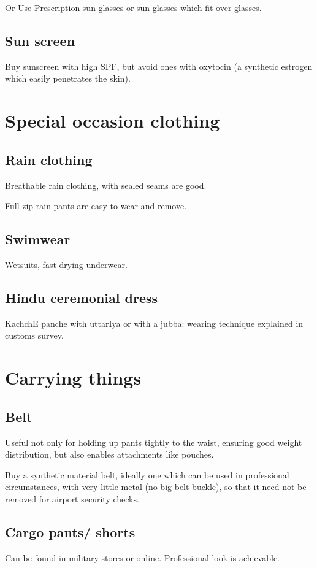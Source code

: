 \documentclass[oneside, article]{memoir}
\begin{document}
Or Use Prescription sun glasses or sun glasses which fit over glasses. 

\section{Sun screen}
Buy sunscreen with high SPF, but avoid ones with oxytocin (a synthetic estrogen which easily penetrates the skin).

\chapter{Special occasion clothing}
\section{Rain clothing}
Breathable rain clothing, with sealed seams are good.

Full zip rain pants are easy to wear and remove.

\section{Swimwear}
Wetsuits, fast drying underwear.

\section{Hindu ceremonial dress}
KachchE panche with uttarIya or with a jubba: wearing technique explained in customs survey.


\chapter{Carrying things}
\section{Belt}
Useful not only for holding up pants tightly to the waist, ensuring good weight distribution, but also enables attachments like pouches.

Buy a synthetic material belt, ideally one which can be used in professional circumstances, with very little metal (no big belt buckle), so that it need not be removed for airport security checks.

\section{Cargo pants/ shorts}
Can be found in military stores or online. Professional look is achievable.
\end{document}
